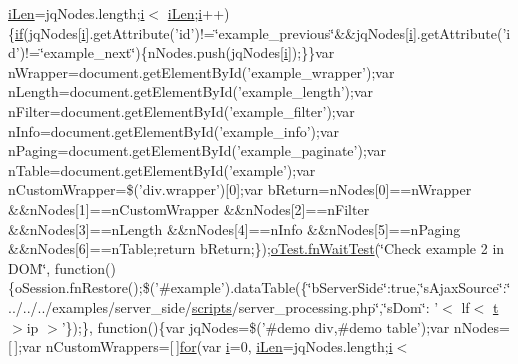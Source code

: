 \begin{DoxyCompactItemize}
\hyperlink{core_8constructor_8js_abfee48f894bf5beb8750699f5f8621e6}{i\+Len}=jq\+Nodes.\+length;\hyperlink{validate_8js_a5e25b1d1bed9ab5f3174b76d6a722180}{i}$<$ \hyperlink{core_8constructor_8js_abfee48f894bf5beb8750699f5f8621e6}{i\+Len};\hyperlink{validate_8js_a5e25b1d1bed9ab5f3174b76d6a722180}{i}++)\{\hyperlink{fullpage_2plugin_8js_a8b98017e64ef036adb9ae327ff94abe1}{if}(jq\+Nodes\mbox{[}\hyperlink{validate_8js_a5e25b1d1bed9ab5f3174b76d6a722180}{i}\mbox{]}.get\+Attribute('id')!=\char`\"{}example\+\_\+previous\char`\"{}\&\&jq\+Nodes\mbox{[}\hyperlink{validate_8js_a5e25b1d1bed9ab5f3174b76d6a722180}{i}\mbox{]}.get\+Attribute('id')!=\char`\"{}example\+\_\+next\char`\"{})\{n\+Nodes.\+push(jq\+Nodes\mbox{[}\hyperlink{validate_8js_a5e25b1d1bed9ab5f3174b76d6a722180}{i}\mbox{]});\}\}var n\+Wrapper=document.\+get\+Element\+By\+Id('example\+\_\+wrapper');var n\+Length=document.\+get\+Element\+By\+Id('example\+\_\+length');var n\+Filter=document.\+get\+Element\+By\+Id('example\+\_\+filter');var n\+Info=document.\+get\+Element\+By\+Id('example\+\_\+info');var n\+Paging=document.\+get\+Element\+By\+Id('example\+\_\+paginate');var n\+Table=document.\+get\+Element\+By\+Id('example');var n\+Custom\+Wrapper=\$('div.\+wrapper')\mbox{[}0\mbox{]};var b\+Return=n\+Nodes\mbox{[}0\mbox{]}==n\+Wrapper \&\&n\+Nodes\mbox{[}1\mbox{]}==n\+Custom\+Wrapper \&\&n\+Nodes\mbox{[}2\mbox{]}==n\+Filter \&\&n\+Nodes\mbox{[}3\mbox{]}==n\+Length \&\&n\+Nodes\mbox{[}4\mbox{]}==n\+Info \&\&n\+Nodes\mbox{[}5\mbox{]}==n\+Paging \&\&n\+Nodes\mbox{[}6\mbox{]}==n\+Table;return b\+Return;\});\hyperlink{onhold_24__server-side_2__zero__config_8js_ab25c4d596771c0133cdc45178ce72c3d}{o\+Test.\+fn\+Wait\+Test}(\char`\"{}Check example 2 in D\+O\+M\char`\"{}, function()\{o\+Session.\+fn\+Restore();\$('\#example').data\+Table(\{\char`\"{}b\+Server\+Side\char`\"{}\+:true,\char`\"{}s\+Ajax\+Source\char`\"{}\+:\char`\"{}../../../examples/server\+\_\+side/\hyperlink{tinymce_8jquery_8dev_8js_a09066d4d580eeec222f858d588b4cdef}{scripts}/server\+\_\+processing.\+php\char`\"{},\char`\"{}s\+Dom\char`\"{}\+: '$<$ lf$<$ \hyperlink{jquery_8knob_8js_aa09e7cf223942a40813c00a3897b7c48}{t} $>$ip $>$'\});\}, function()\{var jq\+Nodes=\$('\#demo div,\#demo table');var n\+Nodes=\mbox{[}$\,$\mbox{]};var n\+Custom\+Wrappers=\mbox{[}$\,$\mbox{]}\hyperlink{tinymce_8jquery_8dev_8js_a4675a875b20881bc5f7011f49fbd4da7}{for}(var \hyperlink{validate_8js_a5e25b1d1bed9ab5f3174b76d6a722180}{i}=0, \hyperlink{core_8constructor_8js_abfee48f894bf5beb8750699f5f8621e6}{i\+Len}=jq\+Nodes.\+length;\hyperlink{validate_8js_a5e25b1d1bed9ab5f3174b76d6a722180}{i}$<$ 
\end{DoxyCompactItemize}
